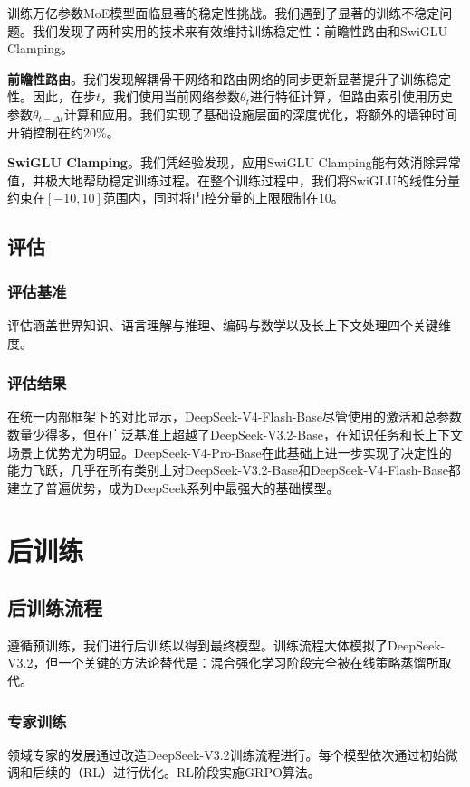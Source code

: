\documentclass[11pt,a4paper]{article}
\newcommand{\dsvfourpro}{DeepSeek-V4-Pro}
\newcommand{\dsvfourflash}{DeepSeek-V4-Flash}
\newcommand{\dsvthreetwo}{DeepSeek-V3.2}
\newcommand{\moe}{MoE}
\begin{document}
训练万亿参数\moe{}模型面临显著的稳定性挑战。我们遇到了显著的训练不稳定问题。我们发现了两种实用的技术来有效维持训练稳定性：前瞻性路由和SwiGLU Clamping。

\textbf{前瞻性路由}。我们发现解耦骨干网络和路由网络的同步更新显著提升了训练稳定性。因此，在步\(t\)，我们使用当前网络参数\(\theta_t\)进行特征计算，但路由索引使用历史参数\(\theta_{t-\Delta t}\)计算和应用。我们实现了基础设施层面的深度优化，将额外的墙钟时间开销控制在约\(20\%\)。

\textbf{SwiGLU Clamping}。我们凭经验发现，应用SwiGLU Clamping能有效消除异常值，并极大地帮助稳定训练过程。在整个训练过程中，我们将SwiGLU的线性分量约束在\([-10,10]\)范围内，同时将门控分量的上限限制在10。

\subsection{评估}

\subsubsection{评估基准}
评估涵盖世界知识、语言理解与推理、编码与数学以及长上下文处理四个关键维度。

\subsubsection{评估结果}
在统一内部框架下的对比显示，\dsvfourflash-Base尽管使用的激活和总参数数量少得多，但在广泛基准上超越了\dsvthreetwo-Base，在知识任务和长上下文场景上优势尤为明显。\dsvfourpro-Base在此基础上进一步实现了决定性的能力飞跃，几乎在所有类别上对\dsvthreetwo-Base和\dsvfourflash-Base都建立了普遍优势，成为DeepSeek系列中最强大的基础模型。

\section{后训练}

\subsection{后训练流程}
遵循预训练，我们进行后训练以得到最终模型。训练流程大体模拟了\dsvthreetwo，但一个关键的方法论替代是：混合强化学习阶段完全被在线策略蒸馏所取代。

\subsubsection{专家训练}
领域专家的发展通过改造\dsvthreetwo 训练流程进行。每个模型依次通过初始微调和后续的（RL）进行优化。RL阶段实施GRPO算法。
\end{document}

